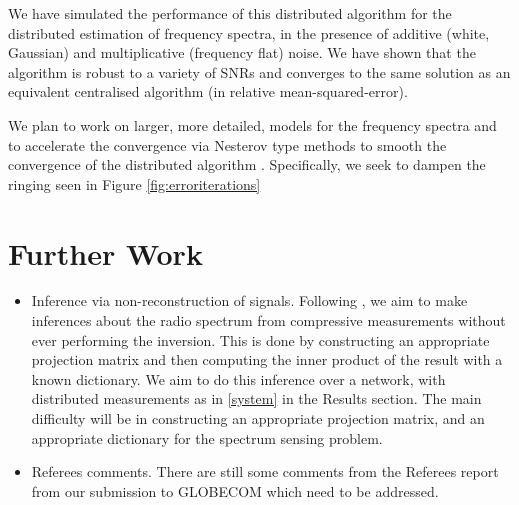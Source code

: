 \documentclass{article}
\begin{document}
We have simulated the performance of this distributed algorithm for the distributed estimation of frequency spectra, in the presence of additive (white, Gaussian) and multiplicative (frequency flat) noise. We have shown that the algorithm is robust to a variety of SNRs and converges to the same solution as an equivalent centralised algorithm (in relative mean-squared-error).

We plan to work on larger, more detailed, models for the frequency spectra and to accelerate the convergence via Nesterov type methods to smooth the convergence of the distributed algorithm \cite{goldstein2014fast}. Specifically, we seek to dampen the ringing seen in Figure \ref{fig:erroriterations}

\section{Further Work}

\begin{itemize}
\item Inference via non-reconstruction of signals. 
Following \cite{davenport2010signal}, we aim to make inferences about the radio spectrum from compressive measurements without ever performing the inversion. This is done by constructing an appropriate projection matrix and then computing the inner product of the result with a known dictionary.
We aim to do this inference over a network, with distributed measurements as in \ref{system} in the Results section. The main difficulty will be in constructing an appropriate projection matrix, and an appropriate dictionary for the spectrum sensing problem.
\item Referees comments. There are still some comments from the Referees report from our submission to GLOBECOM which need to be addressed.
\end{itemize}
\end{document}
